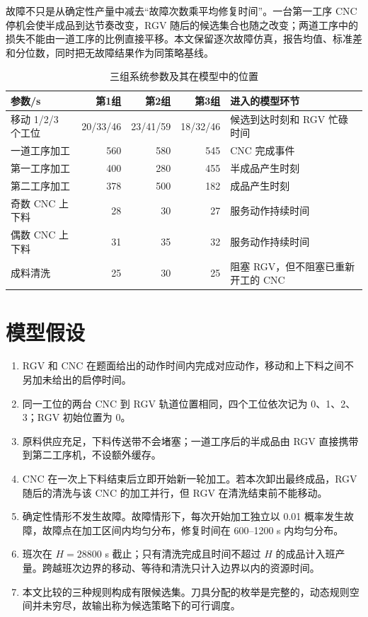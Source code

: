 \documentclass[UTF8,11pt,a4paper]{ctexart}
\begin{document}
故障不只是从确定性产量中减去“故障次数乘平均修复时间”。一台第一工序 CNC 停机会使半成品到达节奏改变，RGV 随后的候选集合也随之改变；两道工序中的损失不能由一道工序的比例直接平移。本文保留逐次故障仿真，报告均值、标准差和分位数，同时把无故障结果作为同策略基线。

\begin{table}[H]
\centering
\caption{三组系统参数及其在模型中的位置}
\label{tab:parameters-b}
\small
\begin{tabularx}{\textwidth}{p{4.7cm}rrrX}
\toprule
参数/s & 第1组 & 第2组 & 第3组 & 进入的模型环节\\
\midrule
移动 1/2/3 个工位 & 20/33/46 & 23/41/59 & 18/32/46 & 候选到达时刻和 RGV 忙碌时间\\
一道工序加工 & 560 & 580 & 545 & CNC 完成事件\\
第一工序加工 & 400 & 280 & 455 & 半成品产生时刻\\
第二工序加工 & 378 & 500 & 182 & 成品产生时刻\\
奇数 CNC 上下料 & 28 & 30 & 27 & 服务动作持续时间\\
偶数 CNC 上下料 & 31 & 35 & 32 & 服务动作持续时间\\
成料清洗 & 25 & 30 & 25 & 阻塞 RGV，但不阻塞已重新开工的 CNC\\
\bottomrule
\end{tabularx}
\end{table}

\section{模型假设}
\begin{enumerate}[label=\arabic*)]
\item RGV 和 CNC 在题面给出的动作时间内完成对应动作，移动和上下料之间不另加未给出的启停时间。
\item 同一工位的两台 CNC 到 RGV 轨道位置相同，四个工位依次记为 0、1、2、3；RGV 初始位置为 0。
\item 原料供应充足，下料传送带不会堵塞；一道工序后的半成品由 RGV 直接携带到第二工序机，不设额外缓存。
\item CNC 在一次上下料结束后立即开始新一轮加工。若本次卸出最终成品，RGV 随后的清洗与该 CNC 的加工并行，但 RGV 在清洗结束前不能移动。
\item 确定性情形不发生故障。故障情形下，每次开始加工独立以 0.01 概率发生故障，故障点在加工区间内均匀分布，修复时间在 600--1200 s 内均匀分布。
\item 班次在 $H=28800$ s 截止；只有清洗完成且时间不超过 $H$ 的成品计入班产量。跨越班次边界的移动、等待和清洗只计入边界以内的资源时间。
\item 本文比较的三种规则构成有限候选集。刀具分配的枚举是完整的，动态规则空间并未穷尽，故输出称为候选策略下的可行调度。
\end{enumerate}
\end{document}
